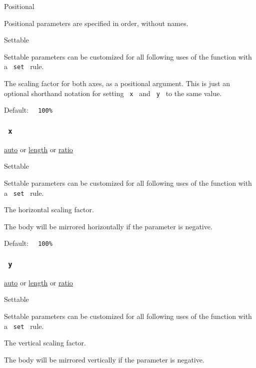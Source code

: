 {{ Positional }}

\label{parameters-factor-positional-tooltip}
Positional parameters are specified in order, without names.

{{ Settable }}

\label{parameters-factor-settable-tooltip}
Settable parameters can be customized for all following uses of the
function with a \texttt{\ set\ } rule.

The scaling factor for both axes, as a positional argument. This is just
an optional shorthand notation for setting \texttt{\ x\ } and
\texttt{\ y\ } to the same value.

Default: \texttt{\ }{\texttt{\ 100\%\ }}\texttt{\ }

\subsubsection{\texorpdfstring{\texttt{\ x\ }}{ x }}\label{parameters-x}

\href{/docs/reference/foundations/auto/}{auto} {or}
\href{/docs/reference/layout/length/}{length} {or}
\href{/docs/reference/layout/ratio/}{ratio}

{{ Settable }}

\label{parameters-x-settable-tooltip}
Settable parameters can be customized for all following uses of the
function with a \texttt{\ set\ } rule.

The horizontal scaling factor.

The body will be mirrored horizontally if the parameter is negative.

Default: \texttt{\ }{\texttt{\ 100\%\ }}\texttt{\ }

\subsubsection{\texorpdfstring{\texttt{\ y\ }}{ y }}\label{parameters-y}

\href{/docs/reference/foundations/auto/}{auto} {or}
\href{/docs/reference/layout/length/}{length} {or}
\href{/docs/reference/layout/ratio/}{ratio}

{{ Settable }}

\label{parameters-y-settable-tooltip}
Settable parameters can be customized for all following uses of the
function with a \texttt{\ set\ } rule.

The vertical scaling factor.

The body will be mirrored vertically if the parameter is negative.

